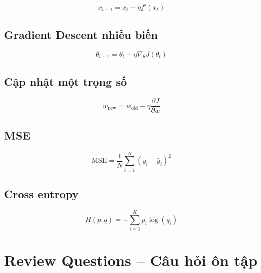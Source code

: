 \[
    x_{t+1}
    =
    x_t
    -
    \eta f'(x_t)
\]

\subsection*{Gradient Descent nhiều biến}

\[
    \theta_{t+1}
    =
    \theta_t
    -
    \eta \nabla_{\theta}J(\theta_t)
\]

\subsection*{Cập nhật một trọng số}

\[
    w_{\text{new}}
    =
    w_{\text{old}}
    -
    \eta
    \frac{\partial J}{\partial w}
\]

\subsection*{MSE}

\[
    \text{MSE}
    =
    \frac{1}{N}
    \sum_{i=1}^{N}
    (y_i-\hat{y}_i)^2
\]

\subsection*{Cross entropy}

\[
    H(p,q)
    =
    -\sum_{i=1}^{K}
    p_i\log(q_i)
\]

\section{Review Questions -- Câu hỏi ôn tập}

